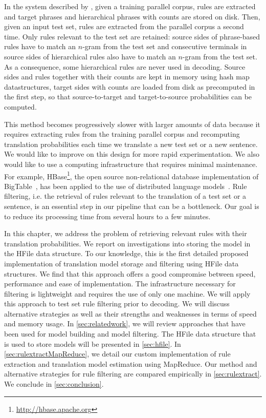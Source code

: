 In the system
described by \citet{iglesias-degispert-banga-byrne:2009:NAACL},
given a training parallel corpus, rules are extracted and target
phrases and hierarchical phrases with counts are stored on disk.
Then, given an input test set, rules are extracted from the parallel
corpus a second time. Only rules relevant to the test set
are retained: source sides of phrase-based rules have to match
an $n$-gram from the test set and consecutive terminals
in source sides of hierarchical rules also have to match
an $n$-gram from the test set. As a consequence, some hierarchical
rules are never used in decoding. %
Source sides and rules together with their counts are kept
in memory using hash map datastructures, target sides with counts
are loaded from disk as precomputed in the first step, so that
source-to-target and target-to-source probabilities can be computed.

This
method becomes progressively slower with larger amounts of data
because it requires extracting rules from the training parallel corpus
and recomputing translation probabilities
each time we translate a new test set or a new
sentence. We
would like to improve on this design for more rapid experimentation. We also would like
to use a computing infrastructure that requires minimal maintenance. For example,
HBase\footnote{\url{http://hbase.apache.org}}, the open source non-relational database
implementation of
BigTable~\citep{chang-dean-ghemawat-hsieh-wallach-burrows-chandra-fikes-gruber:2008:ACM}, has been applied to the use of distributed language
models~\citep{yu:2008:mastersthesis}.
Rule filtering, i.e. the retrieval of rules relevant to the translation
of a test set or a sentence, is an essential step in our pipeline that can be a
bottleneck. Our goal is to reduce its processing time from several hours to a
few minutes.

In this chapter, we address the problem of retrieving relevant rules with their
translation probabilities. We report on investigations into
storing the model in the HFile data
structure. To our knowledge, this is the first
detailed proposed implementation of translation model storage and
filtering using HFile data structures. We find that this approach
offers a good compromise
between speed, performance and ease of implementation. The infrastructure necessary
for filtering is lightweight and requires the use of only one machine. We will
apply this approach to test set rule filtering prior
to decoding. We will discuss alternative
strategies as well as their strengths and weaknesses in terms of speed and
memory usage. In \autoref{sec:relatedwork}, we will review approaches that
have been used for model building and model filtering.
The HFile data structure that is used to
store models will be presented in \autoref{sec:hfile}.
In \autoref{sec:rulextractMapReduce}, we detail our custom implementation
of rule extraction and translation model estimation using
MapReduce. Our method and
alternative strategies for rule filtering are compared empirically in
\autoref{sec:rulextract}. We conclude in \autoref{sec:conclusion}.

